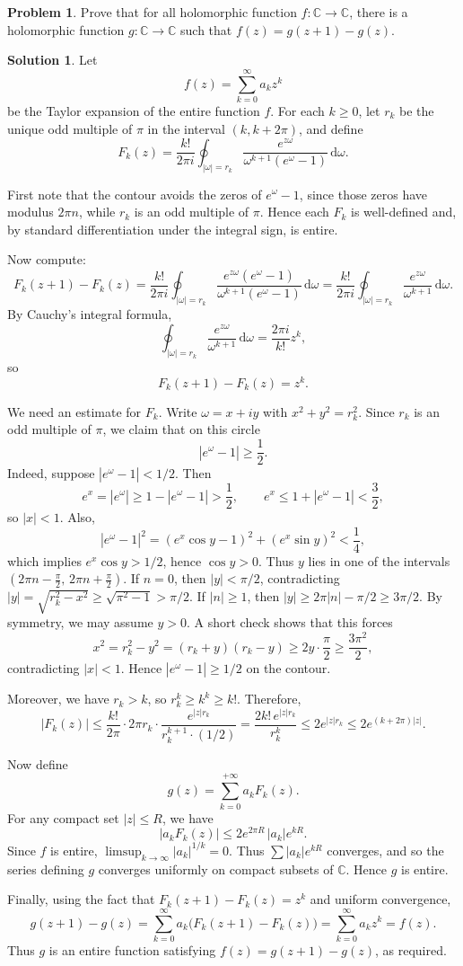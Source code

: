 \documentclass{article}
\theoremstyle{definition}
\newtheorem{problem}{Problem}
\newtheorem{solution}{Solution}
\newcommand{\C}{\mathbb{C}}
\newcommand{\dd}{\mathrm{d}}
\renewcommand{\geq}{\geqslant}
\renewcommand{\le}{\leqslant}
\renewcommand{\ge}{\geqslant}
\begin{document}
\begin{problem}
    Prove that for all holomorphic function $f\colon \C\to \C$, there is a holomorphic function $g\colon \C\to \C$ such that $f(z)=g(z+1)-g(z)$.
\end{problem}
\begin{solution}
    Let  
\[
f(z)=\sum_{k=0}^{\infty} a_k z^k
\]
be the Taylor expansion of the entire function \(f\). For each \(k\ge 0\), let \(r_k\) be the unique odd multiple of \(\pi\) in the interval \((k,k+2\pi)\), and define
\[
F_k(z)=\frac{k!}{2\pi i}\oint_{|\omega|=r_k}\frac{e^{z\omega}}{\omega^{k+1}(e^\omega-1)}\,\dd\omega .
\]

First note that the contour avoids the zeros of \(e^\omega-1\), since those zeros have modulus \(2\pi n\), while \(r_k\) is an odd multiple of \(\pi\). Hence each \(F_k\) is well-defined and, by standard differentiation under the integral sign, is entire.

Now compute:
\[
F_k(z+1)-F_k(z)
= \frac{k!}{2\pi i}\oint_{|\omega|=r_k}
\frac{e^{z\omega}(e^\omega-1)}{\omega^{k+1}(e^\omega-1)}\,\dd\omega
= \frac{k!}{2\pi i}\oint_{|\omega|=r_k}\frac{e^{z\omega}}{\omega^{k+1}}\,\dd\omega .
\]
By Cauchy's integral formula,
\[
\oint_{|\omega|=r_k}\frac{e^{z\omega}}{\omega^{k+1}}\,\dd\omega
= \frac{2\pi i}{k!} z^k,
\]
so
\[
F_k(z+1)-F_k(z)=z^k.
\]

We need an estimate for \(F_k\). Write \(\omega=x+iy\) with \(x^2+y^2=r_k^2\). Since \(r_k\) is an odd multiple of \(\pi\), we claim that on this circle
\[
|e^\omega-1|\ge \frac12.
\]
Indeed, suppose \(|e^\omega-1|<1/2\). Then
\[
e^x=|e^\omega|\ge 1-|e^\omega-1|>\frac12,\qquad
e^x\le 1+|e^\omega-1|<\frac32,
\]
so \(|x|<1\). Also,
\[
|e^\omega-1|^2=(e^x\cos y-1)^2+(e^x\sin y)^2<\frac14,
\]
which implies \(e^x\cos y>1/2\), hence \(\cos y>0\). Thus \(y\) lies in one of the intervals \((2\pi n-\frac{\pi}{2},\,2\pi n+\frac{\pi}{2})\). If \(n=0\), then \(|y|<\pi/2\), contradicting \(|y|=\sqrt{r_k^2-x^2}\ge \sqrt{\pi^2-1}>\pi/2\). If \(|n|\ge 1\), then \(|y|\ge 2\pi|n|-\pi/2\geq 3\pi/2\). By symmetry, we may assume $y>0$. A short check shows that this forces
\[
x^2=r_k^2-y^2=(r_k+y)(r_k-y)\geq 2y\cdot \frac{\pi}{2}\ge \frac{3\pi^2}{2},
\]
contradicting \(|x|<1\). Hence \(|e^\omega-1|\ge 1/2\) on the contour.

Moreover, we have \(r_k>k\), so \(r_k^k\ge k^k\ge k!\). Therefore,
\[
|F_k(z)|
\le \frac{k!}{2\pi}\cdot 2\pi r_k\cdot
\frac{e^{|z|r_k}}{r_k^{k+1}\cdot (1/2)}
= \frac{2k!\,e^{|z|r_k}}{r_k^k}
\le 2e^{|z|r_k}
\le 2e^{(k+2\pi)|z|}.
\]

Now define
\[
g(z)=\sum_{k=0}^{+\infty} a_k F_k(z).
\]
For any compact set \(|z|\le R\), we have 
\[
|a_k F_k(z)|\le 2e^{2\pi R}\, |a_k| e^{kR}.
\]
Since \(f\) is entire, \(\limsup_{k\to\infty}|a_k|^{1/k}=0\). Thus \(\sum |a_k| e^{kR}\) converges, and so the series defining \(g\) converges uniformly on compact subsets of \(\mathbb C\). Hence \(g\) is entire.

Finally, using the fact that \(F_k(z+1)-F_k(z)=z^k\) and uniform convergence,
\[
g(z+1)-g(z)=\sum_{k=0}^{\infty} a_k\bigl(F_k(z+1)-F_k(z)\bigr)=\sum_{k=0}^{\infty} a_k z^k= f(z).
\]
Thus \(g\) is an entire function satisfying \(f(z)=g(z+1)-g(z)\), as required.
\end{solution}
\end{document}
